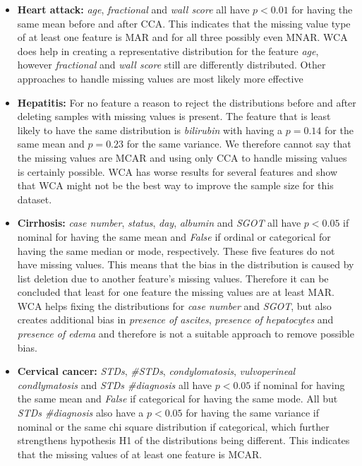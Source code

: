 \documentclass[10pt,a4paper]{article}
\begin{document}
	\begin{itemize}
		\item \textbf{Heart attack:} \textit{age}, \textit{fractional} and \textit{wall score} all have $p < 0.01$ for having the same mean before and after CCA. This indicates that the missing value type of at least one feature is MAR and for all three possibly even MNAR. WCA does help in creating a representative distribution for the feature \textit{age}, however \textit{fractional} and \textit{wall score} still are differently distributed. Other approaches to handle missing values are most likely more effective
		\item \textbf{Hepatitis:} For no feature a reason to reject the distributions before and after deleting samples with missing values is present. The feature that is least likely to have the same distribution is \textit{bilirubin} with having a $p = 0.14$ for the same mean and $p = 0.23$ for the same variance. We therefore cannot say that the missing values are MCAR and using only CCA to handle missing values is certainly possible. WCA has worse results for several features and show that WCA might not be the best way to improve the sample size for this dataset.
		\item \textbf{Cirrhosis:} \textit{case number}, \textit{status}, \textit{day}, \textit{albumin} and \textit{SGOT} all have $p < 0.05$ if nominal for having the same mean and \textit{False} if ordinal or categorical for having the same median or mode, respectively. These five features do not have missing values. This means that the bias in the distribution is caused by list deletion due to another feature's missing values. Therefore it can be concluded that least for one feature the missing values are at least MAR. WCA helps fixing the distributions for \textit{case number} and \textit{SGOT}, but also creates additional bias in \textit{presence of ascites}, \textit{presence of hepatocytes} and \textit{presence of edema} and therefore is not a suitable approach to remove possible bias. 
		\item \textbf{Cervical cancer:} \textit{STDs}, \textit{\#STDs}, \textit{condylomatosis}, \textit{vulvoperineal condlymatosis} and \textit{STDs \#diagnosis} all have $p < 0.05$ if nominal for having the same mean and \textit{False} if categorical for having the same mode. All but \textit{STDs \#diagnosis} also have a $p < 0.05$ for having the same variance if nominal or the same chi square distribution if categorical, which further strengthens hypothesis H1 of the distributions being different. This indicates that the missing values of at least one feature is MCAR.
	\end{itemize}
\end{document}
